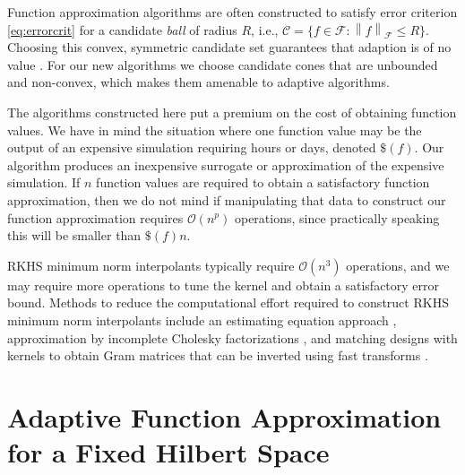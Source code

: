 \documentclass[]{mcom-l}
\theoremstyle{plain}
\theoremstyle{definition}
\newcommand{\cc}{\mathcal{C}}
\newcommand{\calf}{{\mathcal{F}}}
\newcommand{\norm}[2][{}]{\ensuremath{\left \lVert #2 \right \rVert}_{#1}}
\newcommand{\Order}{\mathcal{O}}
\begin{document}
Function approximation algorithms are often constructed to satisfy error criterion \eqref{eq:errorcrit} for a candidate \emph{ball} of radius $R$, i.e., $\cc = \{f \in \calf : \norm[\calf]{f} \le R\}$.  Choosing this convex, symmetric candidate set guarantees that adaption is of no value \cite{Bak71}.  For our new algorithms we choose candidate cones that are unbounded and non-convex, which makes them amenable to adaptive algorithms.

The algorithms constructed here put a premium on the cost of obtaining function values.  We have in mind the situation where one function value may be the output of an expensive simulation requiring hours or days, denoted $\$(f)$.  Our algorithm produces an inexpensive surrogate or approximation of the expensive simulation.  If $n$ function values are required to obtain a satisfactory function approximation, then we do not mind if manipulating that data to construct our function approximation requires $\Order(n^p)$ operations, since practically speaking this will be smaller than $\$(f) n$.  

RKHS minimum  norm interpolants typically require $\Order(n^3)$ operations, and we may require more operations to tune the kernel and obtain a satisfactory error bound.  Methods to reduce the computational effort required to construct RKHS minimum norm interpolants include an estimating equation approach \cite{AniCheSte16a}, approximation by incomplete Cholesky factorizations \cite{OwhEtal19a}, and matching designs with kernels to obtain Gram matrices that can be inverted using fast transforms \cite{RatHic19a}.


\section{Adaptive Function Approximation for a Fixed Hilbert Space} \label{sec:fixedF}

\end{document}

